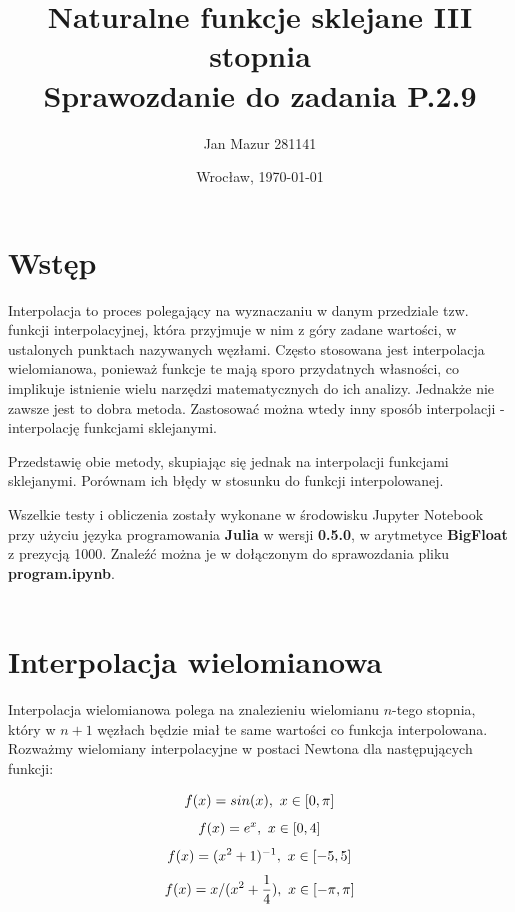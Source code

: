 \documentclass{article}
\author{Jan Mazur 281141}
\date{Wrocław, \today}
\title{\textbf{Naturalne funkcje sklejane III stopnia} \\ Sprawozdanie do zadania P.2.9	}
\begin{document}
\maketitle

\section{Wstęp}

Interpolacja to proces polegający na wyznaczaniu w danym przedziale tzw. funkcji interpolacyjnej, która przyjmuje w nim z góry zadane wartości, w ustalonych punktach nazywanych węzłami. \cite{wikipedia_pl}
Często stosowana jest interpolacja wielomianowa, ponieważ  funkcje te mają sporo przydatnych własności, co implikuje istnienie wielu narzędzi matematycznych do ich analizy. Jednakże nie zawsze jest to dobra metoda.
Zastosować można wtedy inny sposób interpolacji - interpolację funkcjami sklejanymi.

Przedstawię obie metody, skupiając się jednak na interpolacji funkcjami sklejanymi. Porównam ich błędy w stosunku do funkcji interpolowanej.

Wszelkie testy i obliczenia zostały wykonane w środowisku Jupyter Notebook przy użyciu języka programowania \textbf{Julia} w wersji \textbf{0.5.0}, w arytmetyce \textbf{BigFloat} z prezycją 1000.
Znaleźć można je w dołączonym do sprawozdania pliku \textbf{program.ipynb}.\\\\

\section{Interpolacja wielomianowa}
Interpolacja wielomianowa polega na znalezieniu wielomianu $n$-tego stopnia, który w $n+1$ węzłach będzie miał te same wartości co funkcja interpolowana. Rozważmy wielomiany interpolacyjne w postaci Newtona dla następujących funkcji:

\begin{equation}\label{fun1}
	f(x) = sin(x), \textnormal{ } x \in [0,\pi]
\end{equation}
\begin{equation}\label{fun2}
	f(x) = e^x, \textnormal{ } x \in [0,4]
\end{equation}
\begin{equation}\label{fun3}
	f(x) = (x^{2}+1)^{-1}, \textnormal{ } x \in [-5,5]
\end{equation}
\begin{equation}\label{fun4}
	f(x) = x/(x^{2} + \frac{1}{4}), \textnormal{ } x \in [-\pi,\pi]
\end{equation}
\end{document}
